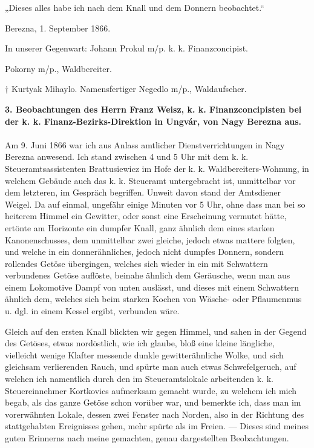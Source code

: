 \documentclass[a4paper, 11pt, oneside, german]{article}
\begin{document}
„Dieses alles habe ich nach dem Knall und dem Donnern beobachtet.“

\hspace*{10mm}Berezna, 1. September 1866.

\hspace*{15mm}In unserer Gegenwart: Johann Prokul m/p. k. k. Finanzconcipist.

\hspace*{15mm}Pokorny m/p., Waldbereiter.

\hspace*{15mm}† Kurtyak Mihaylo. Namensfertiger Negedlo m/p., Waldaufseher.
\begin{center}
\textbf{3. Beobachtungen des Herrn Franz Weisz, k. k. Finanzconcipisten bei der k. k. Finanz-Bezirks-Direktion in Ungvár, von Nagy Berezna aus.}
\end{center}
\paragraph{}
Am 9. Juni 1866 war ich aus Anlass amtlicher Dienstverrichtungen in Nagy Berezna anwesend. Ich stand zwischen 4 und 5 Uhr mit dem k. k. Steueramtsassistenten Brattusiewicz im Hofe der k. k. Waldbereiters-Wohnung, in welchem Gebäude auch das k. k. Steueramt untergebracht ist, unmittelbar vor dem letzteren, im Gespräch begriffen. Unweit davon stand der Amtsdiener Weigel. Da auf einmal, ungefähr einige Minuten vor 5 Uhr, ohne dass man bei so heiterem Himmel ein Gewitter, oder sonst eine Erscheinung vermutet hätte, ertönte am Horizonte ein dumpfer Knall, ganz ähnlich dem eines starken Kanonenschusses, dem unmittelbar zwei gleiche, jedoch etwas mattere folgten, und welche in ein donnerähnliches, jedoch nicht dumpfes Donnern, sondern rollendes Getöse übergingen, welches sich wieder in ein mit Schwattern verbundenes Getöse auflöste, beinahe ähnlich dem Geräusche, wenn man aus einem Lokomotive Dampf von unten auslässt, und dieses mit einem Schwattern ähnlich dem, welches sich beim starken Kochen von Wäsche- oder Pflaumenmus u. dgl. in einem Kessel ergibt, verbunden wäre.

Gleich auf den ersten Knall blickten wir gegen Himmel, und sahen in der Gegend des Getöses, etwas nordöstlich, wie ich glaube, bloß eine kleine längliche, vielleicht wenige Klafter messende dunkle gewitterähnliche Wolke, und sich gleichsam verlierenden Rauch, und spürte man auch etwas Schwefelgeruch, auf welchen ich namentlich durch den im Steueramtslokale arbeitenden k. k. Steuereinnehmer Kortkovics aufmerksam gemacht wurde, zu welchem ich mich begab, als das ganze Getöse schon vorüber war, und bemerkte ich, dass man im vorerwähnten Lokale, dessen zwei Fenster nach Norden, also in der Richtung des stattgehabten Ereignisses gehen, mehr spürte als im Freien. --- Dieses sind meines guten Erinnerns nach meine gemachten, genau dargestellten Beobachtungen.
\end{document}
